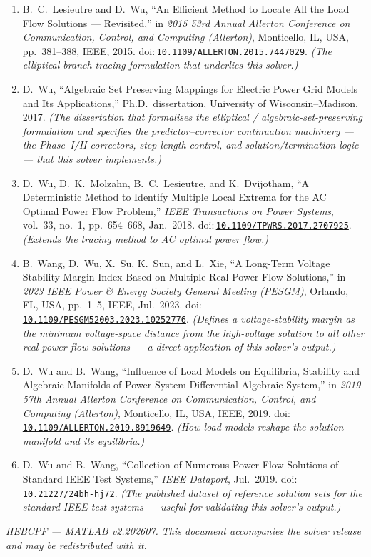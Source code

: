 \documentclass[11pt,a4paper]{article}
\newcommand{\doi}[1]{\href{https://doi.org/#1}{\nolinkurl{#1}}}
\begin{document}
\begin{enumerate}[leftmargin=1.6em]
\item B.\ C.\ Lesieutre and D.\ Wu, ``An Efficient Method to Locate All the Load Flow
      Solutions --- Revisited,'' in \emph{2015 53rd Annual Allerton Conference on
      Communication, Control, and Computing (Allerton)}, Monticello, IL, USA, pp.~381--388,
      IEEE, 2015. doi:\,\doi{10.1109/ALLERTON.2015.7447029}. \emph{(The elliptical
      branch-tracing formulation that underlies this solver.)}
\item D.\ Wu, ``Algebraic Set Preserving Mappings for Electric Power Grid Models and Its
      Applications,'' Ph.D.\ dissertation, University of Wisconsin--Madison, 2017.
      \emph{(The dissertation that formalises the elliptical / algebraic-set-preserving
      formulation and specifies the predictor--corrector continuation machinery --- the
      Phase~I/II correctors, step-length control, and solution/termination logic --- that
      this solver implements.)}
\item D.\ Wu, D.\ K.\ Molzahn, B.\ C.\ Lesieutre, and K.\ Dvijotham, ``A Deterministic
      Method to Identify Multiple Local Extrema for the AC Optimal Power Flow Problem,''
      \emph{IEEE Transactions on Power Systems}, vol.~33, no.~1, pp.~654--668, Jan.\ 2018.
      doi:\,\doi{10.1109/TPWRS.2017.2707925}.
      \emph{(Extends the tracing method to AC optimal power flow.)}
\item B.\ Wang, D.\ Wu, X.\ Su, K.\ Sun, and L.\ Xie, ``A Long-Term Voltage Stability
      Margin Index Based on Multiple Real Power Flow Solutions,'' in \emph{2023 IEEE Power
      \& Energy Society General Meeting (PESGM)}, Orlando, FL, USA, pp.~1--5, IEEE,
      Jul.\ 2023. doi:\,\doi{10.1109/PESGM52003.2023.10252776}.
      \emph{(Defines a voltage-stability margin as the
      minimum voltage-space distance from the high-voltage solution to all other real
      power-flow solutions --- a direct application of this solver's output.)}
\item D.\ Wu and B.\ Wang, ``Influence of Load Models on Equilibria, Stability and
      Algebraic Manifolds of Power System Differential-Algebraic System,'' in \emph{2019
      57th Annual Allerton Conference on Communication, Control, and Computing
      (Allerton)}, Monticello, IL, USA, IEEE, 2019.
      doi:\,\doi{10.1109/ALLERTON.2019.8919649}. \emph{(How load models reshape the
      solution manifold and its equilibria.)}
\item D.\ Wu and B.\ Wang, ``Collection of Numerous Power Flow Solutions of Standard IEEE
      Test Systems,'' \emph{IEEE Dataport}, Jul.\ 2019.
      doi:\,\doi{10.21227/24bh-hj72}. \emph{(The published dataset of reference solution
      sets for the standard IEEE test systems --- useful for validating this solver's
      output.)}
\end{enumerate}

\vfill
\begin{center}\small\itshape
HEBCPF --- MATLAB v2.202607. This document accompanies the solver release and may be
redistributed with it.
\end{center}
\end{document}
